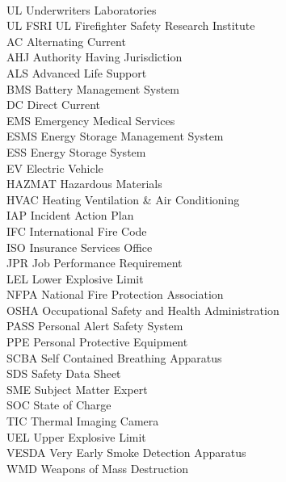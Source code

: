 \documentclass[12pt,oneside]{book}
\begin{document}
\begin{tabbing}
\hspace{1.5in} \= \\
UL 	    \> Underwriters Laboratories \\
UL FSRI \> UL Firefighter Safety Research Institute \\
AC \> Alternating Current \\
AHJ \> Authority Having Jurisdiction \\
ALS \> Advanced Life Support \\
BMS \> Battery Management System \\
DC \> Direct Current \\
EMS \> Emergency Medical Services \\
ESMS \> Energy Storage Management System \\
ESS \> Energy Storage System \\
EV \> Electric Vehicle \\
HAZMAT \> Hazardous Materials \\
HVAC \> Heating Ventilation \& Air Conditioning \\
IAP \> Incident Action Plan \\
IFC \> International Fire Code \\
ISO \> Insurance Services Office \\
JPR \> Job Performance Requirement \\
LEL \> Lower Explosive Limit \\
NFPA \> National Fire Protection Association \\
OSHA \> Occupational Safety and Health Administration \\
PASS \> Personal Alert Safety System \\
PPE \> Personal Protective Equipment \\
SCBA \> Self Contained Breathing Apparatus \\
SDS \> Safety Data Sheet \\
SME \> Subject Matter Expert \\
SOC \> State of Charge \\
TIC \> Thermal Imaging Camera \\
UEL \> Upper Explosive Limit \\
VESDA \> Very Early Smoke Detection Apparatus \\
WMD \> Weapons of Mass Destruction \\

\end{tabbing}
\end{document}
